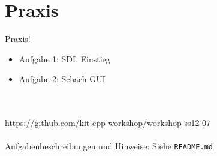 \section{Praxis}
\begin{frame}[fragile]{Praxis!}
	\begin{itemize}
		\item Aufgabe 1: SDL Einstieg
		\item Aufgabe 2: Schach GUI
	\end{itemize}
	\ \\
	\ \\
	\large{\url{https://github.com/kit-cpp-workshop/workshop-ss12-07}} \\
	\ \\
	Aufgabenbeschreibungen und Hinweise: Siehe \verb|README.md|

\end{frame}
